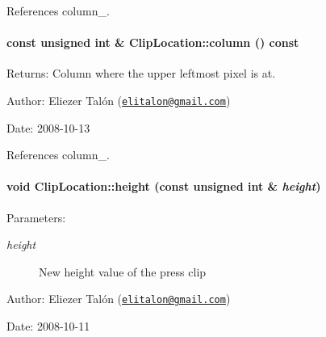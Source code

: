 References column\_\-.\hypertarget{class_clip_location_50409bab2a256787fcc59e5d213d6a58}{
\paragraph[{column}]{\setlength{\rightskip}{0pt plus 5cm}const unsigned int \& ClipLocation::column () const}\hfill}
\label{class_clip_location_50409bab2a256787fcc59e5d213d6a58}


\begin{Desc}
\item[Returns:]Column where the upper leftmost pixel is at.\end{Desc}
\begin{Desc}
\item[Author:]Eliezer Talón (\href{mailto:elitalon@gmail.com}{\tt elitalon@gmail.com}) \end{Desc}
\begin{Desc}
\item[Date:]2008-10-13 \end{Desc}


References column\_\-.\hypertarget{class_clip_location_f0e979e989c1cecbca6fe2da92b383f7}{
\paragraph[{height}]{\setlength{\rightskip}{0pt plus 5cm}void ClipLocation::height (const unsigned int \& {\em height})}\hfill}
\label{class_clip_location_f0e979e989c1cecbca6fe2da92b383f7}


\begin{Desc}
\item[Parameters:]
\begin{description}
\item[{\em height}]New height value of the press clip\end{description}
\end{Desc}
\begin{Desc}
\item[Author:]Eliezer Talón (\href{mailto:elitalon@gmail.com}{\tt elitalon@gmail.com}) \end{Desc}
\begin{Desc}
\item[Date:]2008-10-11 \end{Desc}


